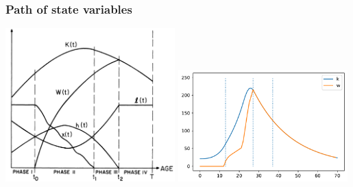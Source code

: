 \documentclass[aspectratio=169]{beamer}
\begin{document}
\begin{frame}
    \frametitle{Path of state variables}
    
        \includegraphics[width=0.49\textwidth]{../output/phases.png}
        \includegraphics[width=0.49\textwidth]{../output/fd_hjb_state_path.pdf}

\end{frame}
\end{document}
